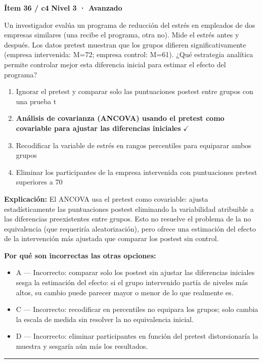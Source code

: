 \documentclass[12pt,a4paper]{article}
\begin{document}
\begin{mdframed}[backgroundcolor=fondogris,linecolor=rojo,linewidth=1pt,innerleftmargin=10pt,innerrightmargin=10pt,innertopmargin=7pt,innerbottommargin=7pt]
\textbf{Ítem 36 / c4} \hfill {\small\bfseries\color{rojo} Nivel 3 · Avanzado}
\end{mdframed}

Un investigador evalúa un programa de reducción del estrés en empleados de dos empresas similares (una recibe el programa, otra no). Mide el estrés antes y después. Los datos pretest muestran que los grupos difieren significativamente (empresa intervenida: M=72; empresa control: M=61). ¿Qué estrategia analítica permite controlar mejor esta diferencia inicial para estimar el efecto del programa?

\begin{enumerate}
  \item[A.] Ignorar el pretest y comparar solo las puntuaciones postest entre grupos con una prueba t
  \item[\textbf{\color{verde}B.}] \textbf{\color{verde} Análisis de covarianza (ANCOVA) usando el pretest como covariable para ajustar las diferencias iniciales} \hfill $\checkmark$
  \item[C.] Recodificar la variable de estrés en rangos percentiles para equiparar ambos grupos
  \item[D.] Eliminar los participantes de la empresa intervenida con puntuaciones pretest superiores a 70
\end{enumerate}

\noindent\textbf{\color{azul}Explicación:} El ANCOVA usa el pretest como covariable: ajusta estadísticamente las puntuaciones postest eliminando la variabilidad atribuible a las diferencias preexistentes entre grupos. Esto no resuelve el problema de la no equivalencia (que requeriría aleatorización), pero ofrece una estimación del efecto de la intervención más ajustada que comparar los postest sin control.

\noindent\textbf{\color{gris}Por qué son incorrectas las otras opciones:}
\begin{itemize}
  \item {\small A — Incorrecto: comparar solo los postest sin ajustar las diferencias iniciales sesga la estimación del efecto: si el grupo intervenido partía de niveles más altos, su cambio puede parecer mayor o menor de lo que realmente es.}
  \item {\small C — Incorrecto: recodificar en percentiles no equipara los grupos; solo cambia la escala de medida sin resolver la no equivalencia inicial.}
  \item {\small D — Incorrecto: eliminar participantes en función del pretest distorsionaría la muestra y sesgaría aún más los resultados.}
\end{itemize}
\vspace{8pt}\hrule\vspace{10pt}
\end{document}
